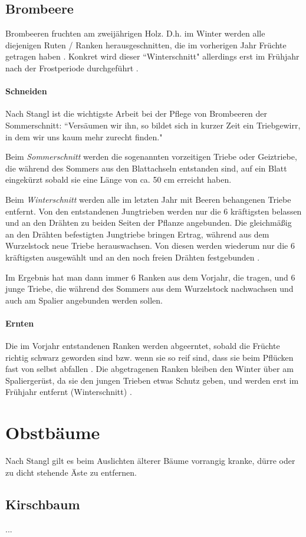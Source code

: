 \subsection{Brombeere}
\label{Brombeere}

Brombeeren fruchten am zweijährigen Holz.
D.h. im Winter werden alle diejenigen Ruten / Ranken herausgeschnitten, die im vorherigen Jahr Früchte getragen haben \cite[S.~176]{Seymour1978}.
Konkret wird dieser ``Winterschnitt" allerdings erst im Frühjahr nach der Frostperiode durchgeführt \cite[S.~196]{Stangl1995}.

\paragraph{Schneiden}

Nach Stangl \cite[S.~196]{Stangl1995} ist die wichtigste Arbeit bei der Pflege von Brombeeren der Sommerschnitt:
``Versäumen wir ihn, so bildet sich in kurzer Zeit ein Triebgewirr, in dem wir uns kaum mehr zurecht finden."

Beim \textit{Sommerschnitt} werden die sogenannten vorzeitigen Triebe oder Geiztriebe, die während des Sommers aus den Blattachseln entstanden sind, auf ein Blatt eingekürzt sobald sie eine Länge von ca. 50 cm erreicht haben.

Beim \textit{Winterschnitt} werden alle im letzten Jahr mit Beeren behangenen Triebe entfernt.
Von den entstandenen Jungtrieben werden nur die 6 kräftigsten belassen und an den Drähten zu beiden Seiten der Pflanze angebunden.
Die gleichmäßig an den Drähten befestigten Jungtriebe bringen Ertrag, während aus dem Wurzelstock neue Triebe herauswachsen.
Von diesen werden wiederum nur die 6 kräftigsten ausgewählt und an den noch freien Drähten festgebunden \cite[S.~197]{Stangl1995}.

Im Ergebnis hat man dann immer 6 Ranken aus dem Vorjahr, die tragen, und 6 junge Triebe, die während des Sommers aus dem Wurzelstock nachwachsen und auch am Spalier angebunden werden sollen.

\paragraph{Ernten}

Die im Vorjahr entstandenen Ranken werden abgeerntet, sobald die Früchte richtig schwarz geworden sind bzw. wenn sie so reif sind, dass sie beim Pflücken fast von selbst abfallen \cite[S.~176]{Seymour1978}.
Die abgetragenen Ranken bleiben den Winter über am Spaliergerüst, da sie den jungen Trieben etwas Schutz geben, und werden erst im Frühjahr entfernt (\textrightarrow Winterschnitt) \cite[S.~197]{Stangl1995}.

\pagebreak

\section{Obstbäume}
\label{Bäume}

Nach Stangl \cite[S.~256]{Stangl1995} gilt es beim Auslichten älterer Bäume vorrangig kranke, dürre oder zu dicht stehende Äste zu entfernen.

\subsection{Kirschbaum}
...



\pagebreak